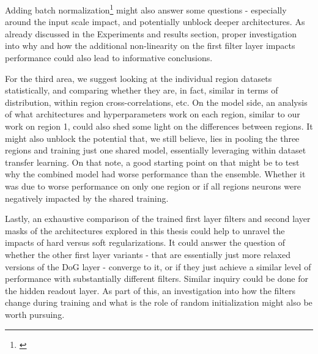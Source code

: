 Adding batch normalization\footnote{\cite{2015arXiv150203167I}} might also answer some questions - especially around the input scale impact, and potentially unblock deeper architectures. As already discussed in the Experiments and results section, proper investigation into why and how the additional non-linearity on the first filter layer impacts performance could also lead to informative conclusions.

For the third area, we suggest looking at the individual region datasets statistically, and comparing whether they are, in fact, similar in terms of distribution, within region cross-correlations, etc. On the model side, an analysis of what architectures and hyperparameters work on each region, similar to our work on region 1, could also shed some light on the differences between regions. It might also unblock the potential that, we still believe, lies in pooling the three regions and training just one shared model, essentially leveraging within dataset transfer learning. On that note, a good starting point on that might be to test why the combined model had worse performance than the ensemble. Whether it was due to worse performance on only one region or if all regions neurons were negatively impacted by the shared training.

Lastly, an exhaustive comparison of the trained first layer filters and second layer masks of the architectures explored in this thesis could help to unravel the impacts of hard versus soft regularizations. It could answer the question of whether the other first layer variants - that are essentially just more relaxed versions of the DoG layer - converge to it, or if they just achieve a similar level of performance with substantially different filters. Similar inquiry could be done for the hidden readout layer. As part of this, an investigation into how the filters change during training and what is the role of random initialization might also be worth pursuing.

